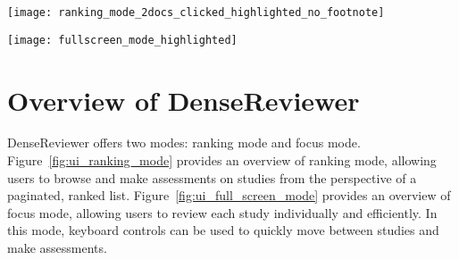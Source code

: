 \begin{figure*}[t!]
\centering
\texttt{[image: ranking\_mode\_2docs\_clicked\_highlighted\_no\_footnote]}
\caption{Ranking mode.  contains the PICO query.  lists the studies; users can use keyboard or mouse controls to expand a study to read and judge. Assessed studies are highlighted in purple.  contains page controls, with a pause button to save the review's progress and toggles to stop upon reaching the last page.  shows two pie charts that display the ratio of reviewed to unreviewed studies and the distribution of judgements and a line chart that displays the relevance discovery curve, indicating the saturation of relevant studies throughout the screening progresses.  allows users to enter focus mode (see Figure~\ref{fig:ui_full_screen_mode}).}
\label{fig:ui_ranking_mode}
\end{figure*}

\begin{figure*}[t!]
\centering
\texttt{[image: fullscreen\_mode\_highlighted]}
\caption{Focus mode.  displays the study's title, list of authors, and PubMed ID. ~contains the full abstract.  includes the three assessment options, a ranking index of the current study on the page, and the page number, positioned centrally, to the left, and right, respectively. Buttons  and  allow users to navigate between studies.}
\label{fig:ui_full_screen_mode}
\end{figure*}


\section{Overview of DenseReviewer}
DenseReviewer offers two modes: ranking mode and focus mode.
Figure~\ref{fig:ui_ranking_mode} provides an overview of ranking mode, allowing users to browse and make assessments on studies from the perspective of a paginated, ranked list. Figure~\ref{fig:ui_full_screen_mode} provides an overview of focus mode, allowing users to review each study individually and efficiently. In this mode, keyboard controls can be used to quickly move between studies and make assessments. 

